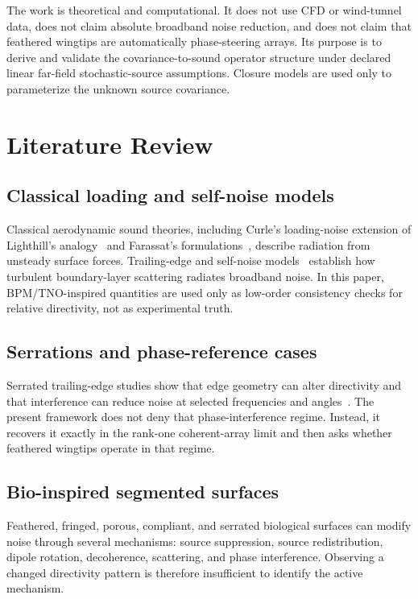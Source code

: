 \documentclass[11pt]{article}
\begin{document}
The work is theoretical and computational. It does not use CFD or wind-tunnel data, does not claim absolute broadband noise reduction, and does not claim that feathered wingtips are automatically phase-steering arrays. Its purpose is to derive and validate the covariance-to-sound operator structure under declared linear far-field stochastic-source assumptions. Closure models are used only to parameterize the unknown source covariance.
\section{Literature Review}

\subsection{Classical loading and self-noise models}
Classical aerodynamic sound theories, including Curle's loading-noise extension of Lighthill's analogy~\cite{Curle1955} and Farassat's formulations~\cite{Farassat2007}, describe radiation from unsteady surface forces. Trailing-edge and self-noise models~\cite{Amiet1976,Howe1978,Brooks1989} establish how turbulent boundary-layer scattering radiates broadband noise. In this paper, BPM/TNO-inspired quantities are used only as low-order consistency checks for relative directivity, not as experimental truth.

\subsection{Serrations and phase-reference cases}
Serrated trailing-edge studies show that edge geometry can alter directivity and that interference can reduce noise at selected frequencies and angles~\cite{Lyu2016SerratedTE}. The present framework does not deny that phase-interference regime. Instead, it recovers it exactly in the rank-one coherent-array limit and then asks whether feathered wingtips operate in that regime.

\subsection{Bio-inspired segmented surfaces}
Feathered, fringed, porous, compliant, and serrated biological surfaces can modify noise through several mechanisms: source suppression, source redistribution, dipole rotation, decoherence, scattering, and phase interference. Observing a changed directivity pattern is therefore insufficient to identify the active mechanism.
\end{document}
